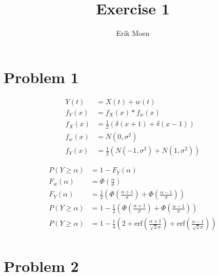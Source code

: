 \documentclass[a4paper, twoside, fleqn]{scrartcl}
\newcommand{\conv}[0]{\ensuremath{\ast}} %
\newcommand{\erf}[0]{\ensuremath{\text{erf}}} %
\begin{document}
\title{Exercise 1}
\subject{TTT4115 Kommunikasjonsteori}
\author{Erik Moen}
\maketitle

\section*{Problem 1}
  \label{1}
  \begin{align}
    Y(t) &= X(t) + w(t) \\
    f_Y(x) &= f_X(x) \conv f_w(x) \\
    f_X(x) &= \frac 1 2 \left( \delta(x+1) + \delta(x-1) \right) \\
    f_w(x) &= N(0, \sigma^2) \\
    f_Y(x) &= \frac 1 2 \left( N(-1, \sigma^2) + N(1, \sigma^2) \right)
  \end{align}
  
  \begin{align}
    P(Y \geq \alpha) &= 1 - F_Y(\alpha) \\
    F_w(\alpha) &= \Phi\left(\frac {\alpha} \sigma\right) \\
    F_Y(\alpha) &= \frac 1 2 \left( \Phi\left(\frac {\alpha + 1} \sigma\right) + \Phi\left(\frac {\alpha - 1} \sigma\right) \right) \\
    P(Y \geq \alpha) &= 1 - \frac 1 2 \left( \Phi\left(\frac {\alpha + 1} \sigma\right) + \Phi\left(\frac {\alpha - 1} \sigma\right) \right) \\
    P(Y \geq \alpha) &= 1 - \frac 1 4 \left( 2 + \erf\left(\frac {\alpha + 1} {\sqrt 2 \sigma} \right) + \erf\left(\frac {\alpha - 1} {\sqrt 2 \sigma} \right) \right) \\
  \end{align}

\section*{Problem 2}
  \label{2}
  
\end{document}
